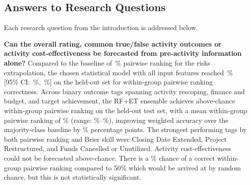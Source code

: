 
\FloatBarrier
\subsection{Answers to Research Questions}
Each research question from the introduction is addressed below.

\textbf{Can the overall rating, common true/false activity outcomes or activity cost-effectiveness be forecasted from pre-activity information alone?}
Compared to the baseline of \PairwiseHuman\,\% pairwise ranking for the risks extrapolation, the chosen statistical model with all input features reached \PairwiseModel\,\% [95\% CI: \PairwiseCILow\,\%, \PairwiseCIHigh\,\%] on the held-out set for within-group pairwise ranking correctness. Across \NumCuratedPredicted{} binary outcome tags spanning activity rescoping, finance and budget, and target achievement, the RF+ET ensemble achieves above-chance within-group pairwise ranking on the held-out test set, with a mean within-group pairwise ranking of \OutcomeTagPairwiseAvg\% (range: \OutcomeTagPairwiseMin\%--\OutcomeTagPairwiseMax\%), improving weighted accuracy over the majority-class baseline by \OutcomeTagAccImprovement\% percentage points. The strongest performing tags by both pairwise ranking and Brier skill were Closing Date Extended, Project Restructured, and Funds Cancelled or Unutilized. Activity cost-effectiveness could not be forecasted above-chance. There is a \CostEffect\% chance of a correct within-group pairwise ranking compared to 50\% which would be arrived at by random chance, but this is not statistically significant.

